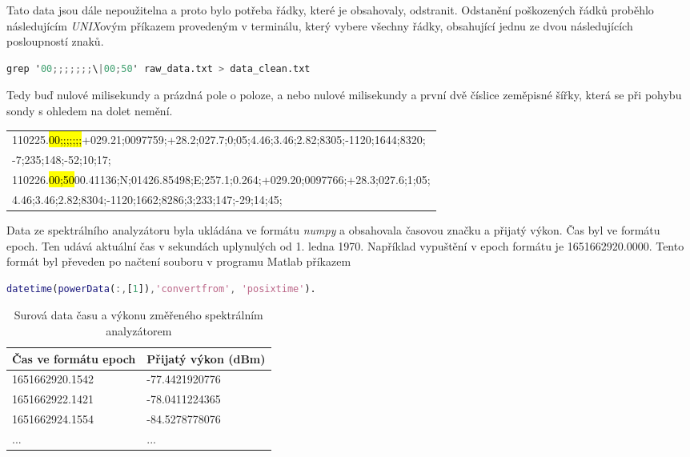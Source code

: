 \documentclass[twoside]{ctuthesis}
\theoremstyle{plain}
\theoremstyle{definition}
\theoremstyle{note}
\begin{document}
	Tato data jsou dále nepoužitelna a proto bylo potřeba řádky, které je obsahovaly, odstranit. Odstanění poškozených řádků proběhlo následujícím \textit{UNIX}ovým příkazem provedeným v terminálu, který vybere všechny řádky, obsahující jednu ze dvou následujících posloupností znaků.
	\begin{lstlisting}[language=Awk]
	grep '00;;;;;;;\|00;50' raw_data.txt > data_clean.txt\end{lstlisting}
	Tedy buď nulové milisekundy a prázdná pole o poloze, a nebo nulové milisekundy a první dvě číslice zeměpisné šířky, která se při pohybu sondy s ohledem na dolet nemění. 
	\begin{table}[h!]
		\centering
		\begin{tabular}{l}
			110225.\hl{00;;;;;;;}+029.21;0097759;+28.2;027.7;0;05;4.46;3.46;2.82;8305;-1120;1644;8320;\\
			-7;235;148;-52;10;17;\\\hline
			110226.\hl{00;50}00.41136;N;01426.85498;E;257.1;0.264;+029.20;0097766;+28.3;027.6;1;05;\\
			4.46;3.46;2.82;8304;-1120;1662;8286;3;233;147;-29;14;45;
		\end{tabular}
	\end{table}

	Data ze spektrálního analyzátoru byla ukládána ve formátu \textit{numpy} a obsahovala časovou značku a přijatý výkon. Čas byl ve formátu epoch. Ten udává aktuální čas v sekundách uplynulých od 1. ledna 1970. Například vypuštění v epoch formátu je 1651662920.0000. Tento formát byl převeden po načtení souboru v programu Matlab příkazem
	\begin{lstlisting}[language=Matlab]
		datetime(powerData(:,[1]),'convertfrom', 'posixtime').\end{lstlisting}
	\begin{table}
		\centering
		\begin{tabular}{l|l}
			Čas ve formátu epoch &	Přijatý výkon (dBm)\\\hline
			1651662920.1542&       -77.4421920776\\
			1651662922.1421 &      -78.0411224365\\
			1651662924.1554  &     -84.5278778076\\
			...&...
		\end{tabular}
		\caption{Surová data času a výkonu změřeného spektrálním analyzátorem}
	\end{table}
\end{document}
